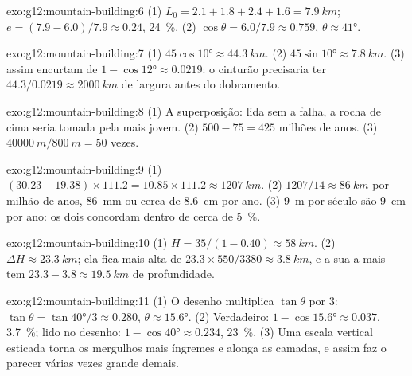 \begin{solution}{exo:g12:mountain-building:6}
(1) $L_0 = 2.1 + 1.8 + 2.4 + 1.6 = \qty{7.9}{km}$;
$e = (7.9 - 6.0)/7.9 \approx 0.24$, \qty{24}{\percent}. (2) $\cos\theta =
6.0/7.9 \approx 0.759$, $\theta \approx \ang{41}$.
\end{solution}

\begin{solution}{exo:g12:mountain-building:7}
(1) $45\cos\ang{10} \approx \qty{44.3}{km}$. (2) $45\sin\ang{10} \approx
\qty{7.8}{km}$. (3)  assim encurtam de $1 - \cos\ang{12} \approx 0.0219$:
o cinturão precisaria ter $44.3/0.0219 \approx \qty{2000}{km}$ de largura
antes do dobramento.
\end{solution}

\begin{solution}{exo:g12:mountain-building:8}
(1) A superposição: lida sem a falha, a rocha de cima seria tomada pela mais
jovem. (2) $500 - 75 = 425$ milhões de anos. (3) $\qty{40000}{m} /
\qty{800}{m} = 50$ vezes.
\end{solution}

\begin{solution}{exo:g12:mountain-building:9}
(1) $(30.23 - 19.38) \times 111.2 = 10.85 \times 111.2 \approx
\qty{1207}{km}$. (2) $1207/14 \approx \qty{86}{km}$ por milhão de anos,
\qty{86}{mm} ou cerca de \qty{8.6}{cm} por ano. (3) \qty{9}{m} por século
são \qty{9}{cm} por ano: os dois concordam dentro de cerca de
\qty{5}{\percent}.
\end{solution}

\begin{solution}{exo:g12:mountain-building:10}
(1) $H = 35/(1 - 0.40) \approx \qty{58}{km}$. (2) $\Delta H \approx
\qty{23.3}{km}$; ela fica mais alta de $23.3 \times 550/3380 \approx
\qty{3.8}{km}$, e a sua  a mais tem $23.3 - 3.8 \approx \qty{19.5}{km}$ de
profundidade.
\end{solution}

\begin{solution}{exo:g12:mountain-building:11}
(1) O desenho multiplica $\tan\theta$ por 3: $\tan\theta = \tan\ang{40}/3
\approx 0.280$, $\theta \approx \ang{15.6}$. (2) Verdadeiro: $1 - \cos\ang{15.6}
\approx 0.037$, \qty{3.7}{\percent}; lido no desenho: $1 - \cos\ang{40}
\approx 0.234$, \qty{23}{\percent}. (3) Uma escala vertical esticada torna
os mergulhos mais íngremes e alonga as camadas, e assim faz o 
parecer várias vezes grande demais.
\end{solution}

